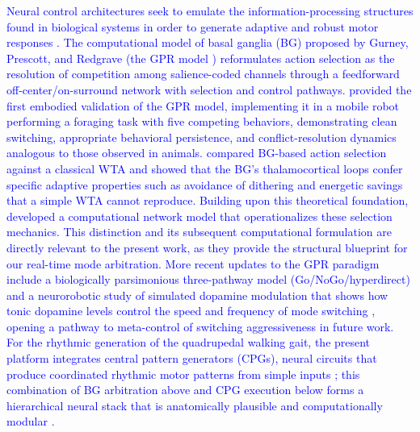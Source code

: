 \documentclass[preprint,12pt]{elsarticle}
\newcommand{\revblue}[1]{\textcolor{blue}{#1}}
\begin{document}
\revblue{Neural control architectures seek to emulate the information-processing structures found in biological systems in order to generate adaptive and robust motor responses \citep{mead1990neuromorphic,ijspeert2008}. The computational model of basal ganglia (BG) proposed by Gurney, Prescott, and Redgrave (the GPR model \citep{Gurney2001a,Gurney2001b}) reformulates action selection as the resolution of competition among salience-coded channels through a feedforward off-center/on-surround network with selection and control pathways. \citet{Prescott2006Robot} provided the first embodied validation of the GPR model, implementing it in a mobile robot performing a foraging task with five competing behaviors, demonstrating clean switching, appropriate behavioral persistence, and conflict-resolution dynamics analogous to those observed in animals. \citet{Girard2003Basal} compared BG-based action selection against a classical WTA and showed that the BG's thalamocortical loops confer specific adaptive properties such as avoidance of dithering and energetic savings that a simple WTA cannot reproduce. Building upon this theoretical foundation, \citet{sarvestani2013computational} developed a computational network model that operationalizes these selection mechanics. This distinction and its subsequent computational formulation are directly relevant to the present work, as they provide the structural blueprint for our real-time mode arbitration. More recent updates to the GPR paradigm include a biologically parsimonious three-pathway model (Go/NoGo/hyperdirect) \citep{Baston2015Biologically} and a neurorobotic study of simulated dopamine modulation that shows how tonic dopamine levels control the speed and frequency of mode switching \citep{Prescott2024Simulated}, opening a pathway to meta-control of switching aggressiveness in future work. For the rhythmic generation of the quadrupedal walking gait, the present platform integrates central pattern generators (CPGs), neural circuits that produce coordinated rhythmic motor patterns from simple inputs \citep{ijspeert2008}; this combination of BG arbitration above and CPG execution below forms a hierarchical neural stack that is anatomically plausible and computationally modular \citep{Bellegarda2022CPGRL,Manoonpong2013Neural}.}
\end{document}

